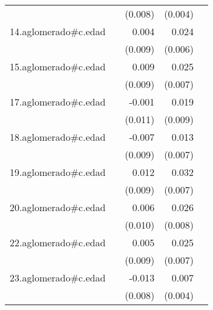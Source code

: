 {\begin{longtable}{l*{4}{D{.}{.}{-1}}}
            &                     &     (0.008)         &     (0.004)         &                     \\
\addlinespace
14.aglomerado#c.edad&                     &       0.004         &       0.024\sym{***}&                     \\
            &                     &     (0.009)         &     (0.006)         &                     \\
\addlinespace
15.aglomerado#c.edad&                     &       0.009         &       0.025\sym{***}&                     \\
            &                     &     (0.009)         &     (0.007)         &                     \\
\addlinespace
17.aglomerado#c.edad&                     &      -0.001         &       0.019\sym{*}  &                     \\
            &                     &     (0.011)         &     (0.009)         &                     \\
\addlinespace
18.aglomerado#c.edad&                     &      -0.007         &       0.013         &                     \\
            &                     &     (0.009)         &     (0.007)         &                     \\
\addlinespace
19.aglomerado#c.edad&                     &       0.012         &       0.032\sym{***}&                     \\
            &                     &     (0.009)         &     (0.007)         &                     \\
\addlinespace
20.aglomerado#c.edad&                     &       0.006         &       0.026\sym{**} &                     \\
            &                     &     (0.010)         &     (0.008)         &                     \\
\addlinespace
22.aglomerado#c.edad&                     &       0.005         &       0.025\sym{***}&                     \\
            &                     &     (0.009)         &     (0.007)         &                     \\
\addlinespace
23.aglomerado#c.edad&                     &      -0.013         &       0.007         &                     \\
            &                     &     (0.008)         &     (0.004)         &                     \\

\end{longtable}}
